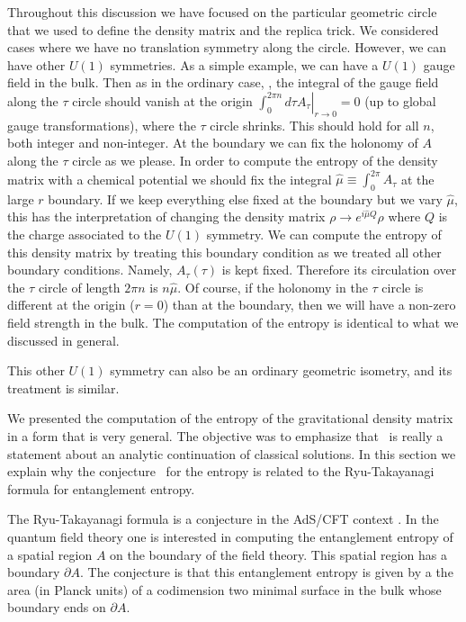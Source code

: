 Throughout this discussion we have focused on the  particular geometric circle that we used to define the
 density matrix and the replica trick. We considered cases where we have no  translation symmetry along
 the circle.  However,
we can have other $U(1)$ symmetries. As a simple example, we can have a  $U(1)$ gauge field in the bulk.
Then as in the ordinary case, \GibbonsUE , the integral of the gauge field along the $\tau$ circle should
vanish at the origin $ \left. \int_0^{ 2 \pi n}  d\tau A_\tau \right|_{r \to 0 } = 0 $  (up to global gauge transformations),
where the $\tau$ circle shrinks.
This should hold for all $n$, both integer and non-integer. At the boundary we can fix the
holonomy of $A$ along  the $\tau$ circle as we please. In order to compute the entropy of the density
matrix with a chemical potential we should  fix the integral
$ \hat \mu \equiv \int_0^{ 2 \pi } A_\tau $ at the large $r$ boundary. If we keep everything else fixed at the boundary
but we vary $\hat \mu$, this has the interpretation of changing the density matrix $\rho \to  e^{ i \hat \mu Q} \rho $
where $Q$ is the charge associated to the $U(1)$  symmetry.
We can compute the entropy of this density matrix by treating this boundary condition
 as we treated all other boundary conditions. Namely,
  $A_\tau(\tau)$ is kept fixed. Therefore its circulation over
 the $\tau$ circle of length $2\pi n$ is  $n\hat \mu$.
 Of course, if the holonomy in the $\tau$ circle is different at the origin ($r=0$) than at the boundary, then
 we will have a non-zero field strength in the bulk. The computation of the entropy is identical to what we
 discussed in general.

 This other $U(1)$ symmetry can also be an ordinary geometric isometry, and its treatment is similar.





We  presented
the computation of the entropy of the gravitational density matrix  in a form that is very general.
The objective was to emphasize that \RTconj\ is really a statement about an analytic continuation
of classical solutions.
In this section we explain why the  conjecture \RTconj\ for the
  entropy is related to the Ryu-Takayanagi  formula for entanglement entropy.

The Ryu-Takayanagi formula is a conjecture in the  AdS/CFT context \RyuBV .
 In the quantum field theory
one is interested in computing the entanglement entropy of a spatial region $A$ on the boundary
of the field theory. This spatial region has a boundary $\partial A$. The conjecture is that
this entanglement entropy is given by a the area (in Planck units) of a codimension two minimal
surface in the bulk whose boundary ends on $\partial A $.
\ifig{} {}

